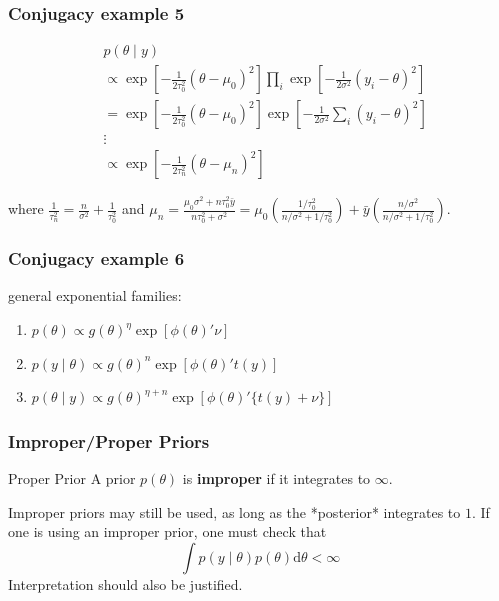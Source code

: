 \documentclass{beamer}
\begin{document}

\begin{frame}[fragile]
\frametitle{Conjugacy example 5}

\begin{align*}
&p(\theta \mid y) \\
&\propto \exp\left[-\frac{1}{2 \tau_0^2}(\theta - \mu_0)^2 \right] \prod_i \exp\left[-\frac{1}{2 \sigma^2} \left(y_i - \theta \right)^2 \right] \\
&= \exp\left[-\frac{1}{2 \tau_0^2}(\theta - \mu_0)^2 \right] \exp\left[-\frac{1}{2 \sigma^2} \sum_i \left(y_i - \theta \right)^2 \right] \\
&\vdots \tag{homework} \\
&\propto \exp\left[ - \frac{1}{2 \tau_n^2} (\theta - \mu_n)^2 \right]
\end{align*}

where $\frac{1}{\tau_n^2} = \frac{n}{\sigma^2} + \frac{1}{\tau_0^2}$ and $\mu_n = \frac{ \mu_0 \sigma^2 + n \tau_0^2 \bar{y}}{n \tau_0^2 + \sigma^2} = \mu_0 \left( \frac{ 1/\tau_0^2 }{n / \sigma^2 + 1/ \tau_0^2}\right) + \bar{y} \left(\frac{ n /\sigma^2}{n /\sigma^2 + 1/\tau_0^2}\right)$. 

\end{frame}




\begin{frame}[fragile]
\frametitle{Conjugacy example 6}

general exponential families:
\begin{enumerate}
\item $p(\theta) \propto g(\theta)^{\eta} \exp\left[\phi(\theta)' \nu \right]$
\item $p(y \mid \theta) \propto g(\theta)^{n} \exp\left[\phi(\theta)' t(y) \right] $
\item $p(\theta \mid y) \propto g(\theta)^{\eta + n} \exp\left[\phi(\theta)' \{t(y) + \nu\} \right] $
\end{enumerate}


\end{frame}


\begin{frame}[fragile]
\frametitle{Improper/Proper Priors}

\begin{block}{Proper Prior}
A prior $p(\theta)$ is {\bf improper} if it integrates to $\infty$.
\end{block}

Improper priors may still be used, as long as the *posterior* integrates to $1$. If one is using an improper prior, one must check that 
\[
\int p(y \mid \theta) p(\theta) \text{d}\theta < \infty
\]
Interpretation should also be justified.


\end{frame}
\end{document}
